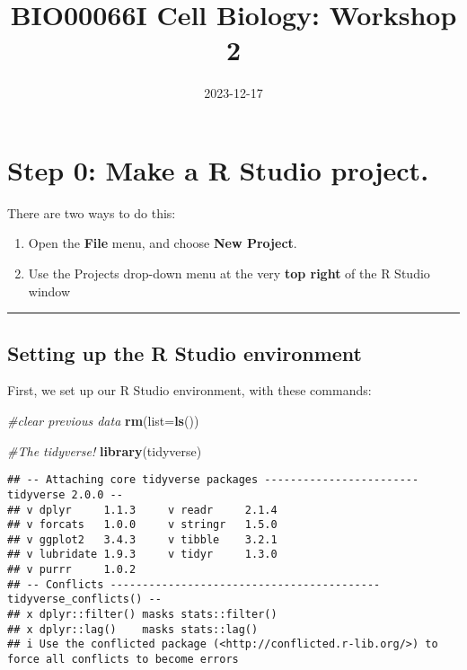 \documentclass[
]{article}
\title{BIO00066I Cell Biology: Workshop 2}
\author{}
\date{\vspace{-2.5em}2023-12-17}
\newenvironment{Shaded}{\begin{snugshade}}{\end{snugshade}}
\newcommand{\AttributeTok}[1]{\textcolor[rgb]{0.13,0.29,0.53}{#1}}
\newcommand{\CommentTok}[1]{\textcolor[rgb]{0.56,0.35,0.01}{\textit{#1}}}
\newcommand{\FunctionTok}[1]{\textcolor[rgb]{0.13,0.29,0.53}{\textbf{#1}}}
\newcommand{\NormalTok}[1]{#1}
\providecommand{\tightlist}{%
  \setlength{\itemsep}{0pt}\setlength{\parskip}{0pt}}
\begin{document}
\maketitle

{
\setcounter{tocdepth}{2}
\tableofcontents
}
\hypertarget{step-0-make-a-r-studio-project.}{%
\section{Step 0: Make a R Studio
project.}\label{step-0-make-a-r-studio-project.}}

There are two ways to do this:

\begin{enumerate}
\def\labelenumi{\arabic{enumi}.}
\tightlist
\item
  Open the \textbf{File} menu, and choose \textbf{New Project}.
\item
  Use the Projects drop-down menu at the very \textbf{top right} of the
  R Studio window
\end{enumerate}

\begin{center}\rule{0.5\linewidth}{0.5pt}\end{center}

\hypertarget{setting-up-the-r-studio-environment}{%
\subsection{Setting up the R Studio
environment}\label{setting-up-the-r-studio-environment}}

First, we set up our R Studio environment, with these commands:

\begin{Shaded}
\begin{Highlighting}[]
\CommentTok{\#clear previous data}
\FunctionTok{rm}\NormalTok{(}\AttributeTok{list=}\FunctionTok{ls}\NormalTok{())}

\CommentTok{\#The tidyverse!}
\FunctionTok{library}\NormalTok{(tidyverse)}
\end{Highlighting}
\end{Shaded}

\begin{verbatim}
## -- Attaching core tidyverse packages ------------------------ tidyverse 2.0.0 --
## v dplyr     1.1.3     v readr     2.1.4
## v forcats   1.0.0     v stringr   1.5.0
## v ggplot2   3.4.3     v tibble    3.2.1
## v lubridate 1.9.3     v tidyr     1.3.0
## v purrr     1.0.2     
## -- Conflicts ------------------------------------------ tidyverse_conflicts() --
## x dplyr::filter() masks stats::filter()
## x dplyr::lag()    masks stats::lag()
## i Use the conflicted package (<http://conflicted.r-lib.org/>) to force all conflicts to become errors
\end{verbatim}
\end{document}
